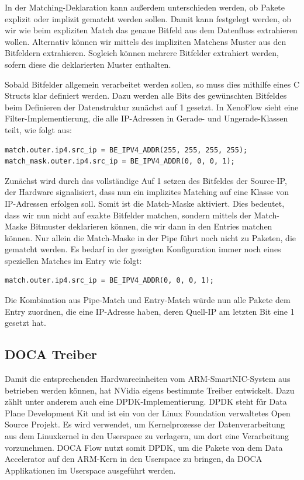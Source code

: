 In der Matching-Deklaration kann außerdem unterschieden werden, ob Pakete explizit oder implizit gematcht werden sollen. Damit kann festgelegt werden, ob wir wie beim expliziten Match das genaue Bitfeld aus dem Datenfluss extrahieren wollen. Alternativ können wir mittels des impliziten Matchens Muster aus den Bitfeldern extrahieren. Sogleich können mehrere Bitfelder extrahiert werden, sofern diese die deklarierten Muster enthalten.


Sobald Bitfelder allgemein verarbeitet werden sollen, so muss dies mithilfe eines C Structs klar definiert werden. Dazu werden alle Bits des gewünschten Bitfeldes beim Definieren der Datenstruktur zunächst auf 1 gesetzt.
In XenoFlow sieht eine Filter-Implementierung, die alle IP-Adressen in Gerade- und Ungerade-Klassen teilt, wie folgt aus:
\begin{verbatim}
match.outer.ip4.src_ip = BE_IPV4_ADDR(255, 255, 255, 255);
match_mask.outer.ip4.src_ip = BE_IPV4_ADDR(0, 0, 0, 1);
\end{verbatim}
Zunächst wird durch das vollständige Auf 1 setzen des Bitfeldes der Source-IP, der Hardware signalisiert, dass nun ein implizites Matching auf eine Klasse von IP-Adressen erfolgen soll. Somit ist die Match-Maske aktiviert. Dies bedeutet, dass wir nun nicht auf exakte Bitfelder matchen, sondern mittels der Match-Maske Bitmuster deklarieren können, die wir dann in den Entries matchen können. Nur allein die Match-Maske in der Pipe führt noch nicht zu Paketen, die gematcht werden. Es bedarf in der gezeigten Konfiguration immer noch eines speziellen Matches im Entry wie folgt: 
\begin{verbatim}
match.outer.ip4.src_ip = BE_IPV4_ADDR(0, 0, 0, 1);
\end{verbatim}
Die Kombination aus Pipe-Match und Entry-Match würde nun alle Pakete dem Entry zuordnen, die eine IP-Adresse haben, deren Quell-IP am letzten Bit eine 1 gesetzt hat.
\subsection{DOCA Treiber}
Damit die entsprechenden Hardwareeinheiten vom ARM-SmartNIC-System aus betrieben werden können, hat NVidia eigens bestimmte Treiber entwickelt. Dazu zählt unter anderem auch eine DPDK-Implementierung. DPDK steht für Data Plane Development Kit und ist ein von der Linux Foundation verwaltetes Open Source Projekt. Es wird verwendet, um Kernelprozesse der Datenverarbeitung aus dem Linuxkernel in den Userspace zu verlagern, um dort eine Verarbeitung vorzunehmen. DOCA Flow nutzt somit DPDK, um die Pakete von dem Data Accelerator auf den ARM-Kern in den Userspace zu bringen, da DOCA Applikationen im Userspace ausgeführt werden. 

